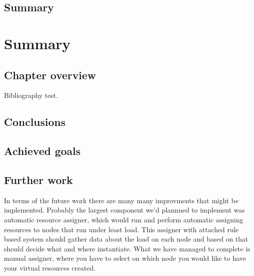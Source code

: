 \documentclass[11pt]{book}
\begin{document}
    \section*{Summary}


  \chapter{Summary}

    \section*{Chapter overview}

      Bibliography \cite{mittelbach2004} test.
	
		

    \section{Conclusions}
	
		

    \section{Achieved goals}
	
		

    \section{Further work}
	
	In terms of the future work there are many many improvments that might be implemented. Probably the largest component we'd plannned to implement was automatic resource assigner, which would run
        and perform automatic assigning resources to nodes that run under least load. This assigner with attached rule based system should gather data about the load on each node and based on that should 
        decide what and where instantiate. What we have managed to complete is manual assigner, where you have to select on which node you would like to have your virtual resources created.
\end{document}
